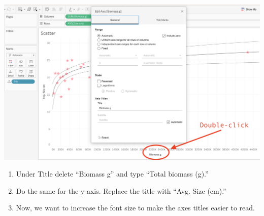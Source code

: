 \documentclass[
]{book}
\providecommand{\tightlist}{%
  \setlength{\itemsep}{0pt}\setlength{\parskip}{0pt}}
\begin{document}
\includegraphics{images/M3S2_edit-axis.png}

\begin{enumerate}
\def\labelenumi{\arabic{enumi}.}
\setcounter{enumi}{1}
\tightlist
\item
  Under Title delete ``Biomass g'' and type ``Total biomass (g).''
\item
  Do the same for the y-axis. Replace the title with ``Avg. Size (cm).''
\item
  Now, we want to increase the font size to make the axes titles easier to read.


\end{enumerate}
\end{document}

